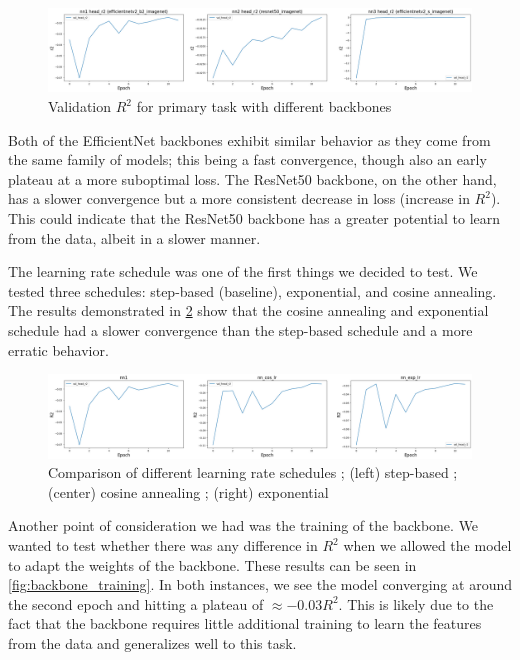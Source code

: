 \documentclass[12pt,a4paper,oneside]{article}
\begin{document}
\begin{figure}[!h]
    \centering
    \includegraphics[width=1\textwidth]{assets/different_backbones.png}
    \caption{Validation $R^2$ for primary task with different backbones}
    \label{fig:different_backbones}
\end{figure}

Both of the EfficientNet backbones exhibit similar behavior as they come from the same family of models; this being a fast convergence, though also an early plateau at a more suboptimal loss. The ResNet50 backbone, on the other hand, has a slower convergence but a more consistent decrease in loss (increase in $R^2$). This could indicate that the ResNet50 backbone has a greater potential to learn from the data, albeit in a slower manner. 

\smallskip 
The learning rate schedule was one of the first things we decided to test. We tested three schedules: step-based (baseline), exponential, and cosine annealing. The results demonstrated in \ref{fig:lr_schedules} show that the cosine annealing and exponential schedule had a slower convergence than the step-based schedule and a more erratic behavior.  

\begin{figure}[!h]
    \centering
    \includegraphics[width=1\textwidth]{assets/lr_schedule_diffs.png}
    \caption{Comparison of different learning rate schedules ; (left) step-based ; (center) cosine annealing ; (right) exponential}
    \label{fig:lr_schedules}
\end{figure}


Another point of consideration we had was the training of the backbone. We wanted to test whether there was any difference in $R^2$ when we allowed the model to adapt the weights of the backbone. These results can be seen in \ref{fig:backbone_training}. In both instances, we see the model converging at around the second epoch and hitting a plateau of $\approx -0.03 R^2$. This is likely due to the fact that the backbone requires little additional training to learn the features from the data and generalizes well to this task.
\end{document}
